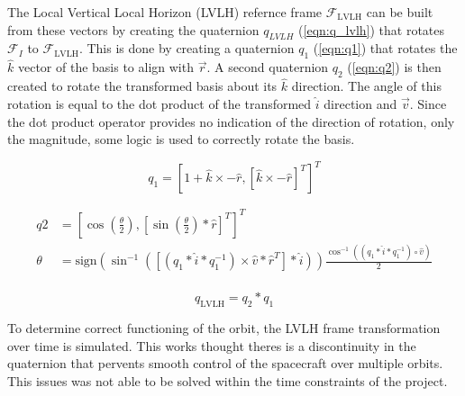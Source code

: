 \documentclass[a4paper]{article}
\begin{document}
The Local Vertical Local Horizon (LVLH) refernce frame $\mathcal{F}_{\textrm{LVLH}}$ can be built from these vectors by creating the quaternion $q_{LVLH}$ (\ref{eqn:q_lvlh}) that rotates $\mathcal{F}_I$ to $\mathcal{F}_{\textrm{LVLH}}$. This is done by creating a quaternion $q_1$ (\ref{eqn:q1}) that rotates the $\hat{k}$ vector of the basis to align with $\vec{r}$. A second quaternion $q_2$ (\ref{eqn:q2}) is then created to rotate the transformed basis about its $\hat{k}$ direction. The angle of this rotation is equal to the dot product of the transformed $\hat{i}$ direction and $\vec{v}$. Since the dot product operator provides no indication of the direction of rotation, only the magnitude, some logic is used to correctly rotate the basis.

\begin{equation}
	q_1 = [1 + \hat{k} \times -\hat{r}, [\hat{k} \times -\hat{r}]^T]^T
	\label{eqn:q1}
\end{equation} 

\begin{equation}
\begin{aligned}
	q2 &= \left[\cos\left(\frac{\theta}{2}\right), \left[\sin\left(\frac{\theta}{2}\right) * \hat{r}\right]^T\right]^T \\
	\theta &= \textrm{sign}\left(\sin^{-1}\left(\left[\left(q_1 * \hat{i} * q_1^{-1}\right) \times \hat{v} * \hat{r}^T\right] * \hat{i}\right)\right)\frac{\cos^{-1}\left(\left(q_1 * \hat{i} * q_1^{-1}\right) \circ \hat{v}\right)}{2} \\ \end{aligned}
	\label{eqn:q2}
\end{equation}

\begin{equation}
	q_{\textrm{LVLH}} = q_2 * q_1
	\label{eqn:q_lvlh}
\end{equation}

To determine correct functioning of the orbit, the LVLH frame transformation over time is simulated. This works thought theres is a discontinuity in the quaternion that pervents smooth control of the spacecraft over multiple orbits. This issues was not able to be solved within the time constraints of the project.
\end{document}
